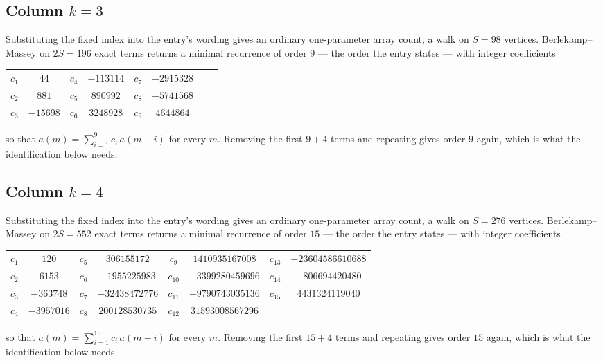\documentclass[11pt,a4paper]{article}
\theoremstyle{plain}
\theoremstyle{definition}
\begin{document}
\subsection*{Column $k=3$}
Substituting the fixed index into the entry's wording gives an ordinary one-parameter array
count, a walk on $S=98$ vertices. Berlekamp--Massey on $2S=196$ exact terms
returns a minimal recurrence of order $9$ --- the order the entry states --- with
integer coefficients
\begin{center}\small\begin{tabular}{cccccccc}
$c_{1}$ & $44$ & $c_{4}$ & $-113114$ & $c_{7}$ & $-2915328$ &  &  \\
$c_{2}$ & $881$ & $c_{5}$ & $890992$ & $c_{8}$ & $-5741568$ &  &  \\
$c_{3}$ & $-15698$ & $c_{6}$ & $3248928$ & $c_{9}$ & $4644864$ &  &  \\
\end{tabular}\end{center}
so that $a(m)=\sum_{i=1}^{9}c_i\,a(m-i)$ for every $m$. Removing the first
$9+4$ terms and repeating gives order $9$ again, which is what the
identification below needs.

\subsection*{Column $k=4$}
Substituting the fixed index into the entry's wording gives an ordinary one-parameter array
count, a walk on $S=276$ vertices. Berlekamp--Massey on $2S=552$ exact terms
returns a minimal recurrence of order $15$ --- the order the entry states --- with
integer coefficients
\begin{center}\small\begin{tabular}{cccccccc}
$c_{1}$ & $120$ & $c_{5}$ & $306155172$ & $c_{9}$ & $1410935167008$ & $c_{13}$ & $-23604586610688$ \\
$c_{2}$ & $6153$ & $c_{6}$ & $-1955225983$ & $c_{10}$ & $-3399280459696$ & $c_{14}$ & $-806694420480$ \\
$c_{3}$ & $-363748$ & $c_{7}$ & $-32438472776$ & $c_{11}$ & $-9790743035136$ & $c_{15}$ & $4431324119040$ \\
$c_{4}$ & $-3957016$ & $c_{8}$ & $200128530735$ & $c_{12}$ & $31593008567296$ &  &  \\
\end{tabular}\end{center}
so that $a(m)=\sum_{i=1}^{15}c_i\,a(m-i)$ for every $m$. Removing the first
$15+4$ terms and repeating gives order $15$ again, which is what the
identification below needs.
\end{document}
